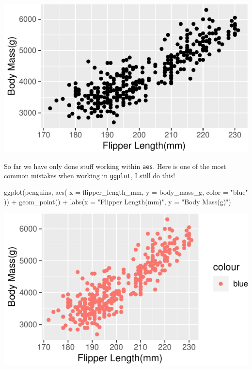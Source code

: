 \documentclass[]{tufte-handout}
\newenvironment{Shaded}{}{}
\newcommand{\AttributeTok}[1]{\textcolor[rgb]{0.49,0.56,0.16}{#1}}
\newcommand{\FunctionTok}[1]{\textcolor[rgb]{0.02,0.16,0.49}{#1}}
\newcommand{\NormalTok}[1]{#1}
\newcommand{\SpecialCharTok}[1]{\textcolor[rgb]{0.25,0.44,0.63}{#1}}
\newcommand{\StringTok}[1]{\textcolor[rgb]{0.25,0.44,0.63}{#1}}
\begin{document}
\begin{center}\includegraphics{R-Guide_files/figure-latex/scatter-plot-labs-1} \end{center}

So far we have only done stuff working within \texttt{aes}. Here is one
of the most common mistakes when working in \texttt{ggplot}, I still do
this!

\begin{Shaded}
\begin{Highlighting}[]
\FunctionTok{ggplot}\NormalTok{(penguins, }\FunctionTok{aes}\NormalTok{(}
  \AttributeTok{x =}\NormalTok{ flipper\_length\_mm, }\AttributeTok{y =}\NormalTok{ body\_mass\_g,}
  \AttributeTok{color =} \StringTok{"blue"}
\NormalTok{)) }\SpecialCharTok{+}
  \FunctionTok{geom\_point}\NormalTok{() }\SpecialCharTok{+}
  \FunctionTok{labs}\NormalTok{(}\AttributeTok{x =} \StringTok{"Flipper Length(mm)"}\NormalTok{, }\AttributeTok{y =} \StringTok{"Body Mass(g)"}\NormalTok{)}
\end{Highlighting}
\end{Shaded}

\begin{center}\includegraphics{R-Guide_files/figure-latex/mistake-easy-1} \end{center}
\end{document}
